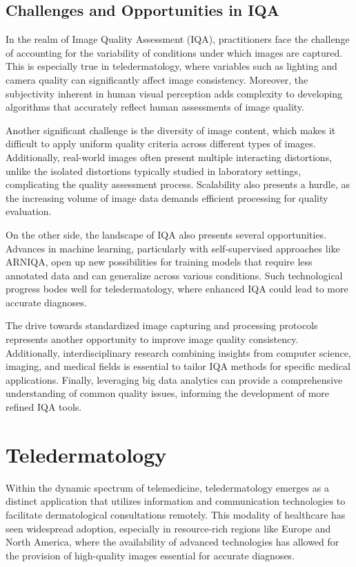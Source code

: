 \subsection{Challenges and Opportunities in IQA}
\label{sub:ChallengesOpportunitiesIQA}
In the realm of Image Quality Assessment (IQA), practitioners face the challenge of accounting for the variability of conditions under which images are captured. This is especially true in teledermatology, where variables such as lighting and camera quality can significantly affect image consistency. Moreover, the subjectivity inherent in human visual perception adds complexity to developing algorithms that accurately reflect human assessments of image quality.\par
\vspace{\baselineskip}
\noindent
Another significant challenge is the diversity of image content, which makes it difficult to apply uniform quality criteria across different types of images. Additionally, real-world images often present multiple interacting distortions, unlike the isolated distortions typically studied in laboratory settings, complicating the quality assessment process. Scalability also presents a hurdle, as the increasing volume of image data demands efficient processing for quality evaluation.\par
\vspace{\baselineskip}
\noindent
On the other side, the landscape of IQA also presents several opportunities. Advances in machine learning, particularly with self-supervised approaches like ARNIQA, open up new possibilities for training models that require less annotated data and can generalize across various conditions. Such technological progress bodes well for teledermatology, where enhanced IQA could lead to more accurate diagnoses.\par
\vspace{\baselineskip}
\noindent
The drive towards standardized image capturing and processing protocols represents another opportunity to improve image quality consistency. Additionally, interdisciplinary research combining insights from computer science, imaging, and medical fields is essential to tailor IQA methods for specific medical applications. Finally, leveraging big data analytics can provide a comprehensive understanding of common quality issues, informing the development of more refined IQA tools. \par


\section{Teledermatology}
\label{sec:Teledermatology}
Within the dynamic spectrum of telemedicine, teledermatology emerges as a distinct application that utilizes information and communication technologies to facilitate dermatological consultations remotely. This modality of healthcare has seen widespread adoption, especially in resource-rich regions like Europe and North America, where the availability of advanced technologies has allowed for the provision of high-quality images essential for accurate diagnoses. \par

